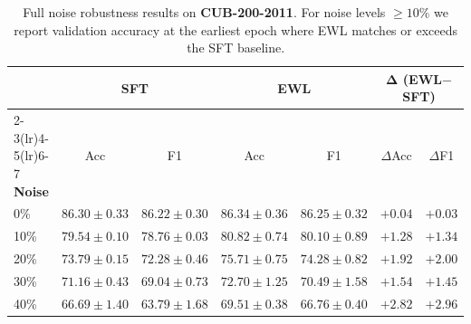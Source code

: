 \begin{table}[h]
  \centering
  \caption{
    Full noise robustness results on \textbf{CUB-200-2011}.
    For noise levels $\geq 10\%$ we report validation accuracy at the
    earliest epoch where EWL matches or exceeds the SFT baseline.
  }
  \label{tab:noise_cub_full}
  \setlength{\tabcolsep}{5pt}
  \begin{tabular}{lcccccc}
    \toprule
    & \multicolumn{2}{c}{\textbf{SFT}} & \multicolumn{2}{c}{\textbf{EWL}} & \multicolumn{2}{c}{$\boldsymbol{\Delta}$ \textbf{(EWL$-$SFT)}} \\
    \cmidrule(lr){2-3}\cmidrule(lr){4-5}\cmidrule(lr){6-7}
    \textbf{Noise} & Acc & F1 & Acc & F1 & $\Delta$Acc & $\Delta$F1 \\
    \midrule
    0\%  & $86.30{\pm}0.33$ & $86.22{\pm}0.30$ & $86.34{\pm}0.36$ & $86.25{\pm}0.32$ & $+0.04$ & $+0.03$ \\
    10\% & $79.54{\pm}0.10$ & $78.76{\pm}0.03$ & $80.82{\pm}0.74$ & $80.10{\pm}0.89$ & $\mathbf{+1.28}$ & $\mathbf{+1.34}$ \\
    20\% & $73.79{\pm}0.15$ & $72.28{\pm}0.46$ & $75.71{\pm}0.75$ & $74.28{\pm}0.82$ & $\mathbf{+1.92}$ & $\mathbf{+2.00}$ \\
    30\% & $71.16{\pm}0.43$ & $69.04{\pm}0.73$ & $72.70{\pm}1.25$ & $70.49{\pm}1.58$ & $\mathbf{+1.54}$ & $\mathbf{+1.45}$ \\
    40\% & $66.69{\pm}1.40$ & $63.79{\pm}1.68$ & $69.51{\pm}0.38$ & $66.76{\pm}0.40$ & $\mathbf{+2.82}$ & $\mathbf{+2.96}$ \\
    \bottomrule
  \end{tabular}
\end{table}

